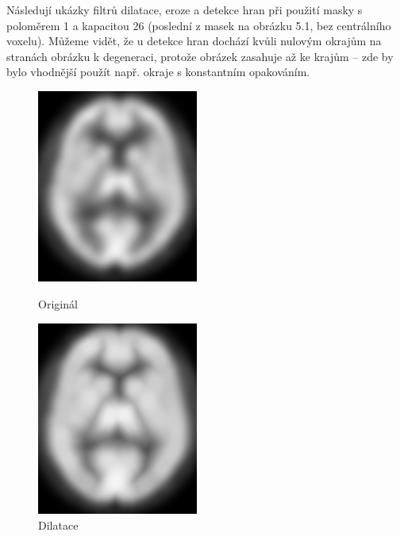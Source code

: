     Následují ukázky filtrů dilatace, eroze a detekce hran při použití masky s poloměrem 1 a kapacitou 26 (poslední z masek na obrázku 5.1, bez centrálního voxelu). Můžeme vidět, že u detekce hran dochází kvůli nulovým okrajům na stranách obrázku k degeneraci, protože obrázek zasahuje až ke krajům -- zde by bylo vhodnější použít např. okraje s konstantním opakováním.
    \vfill
    \newpage
    \begin{figure}[htp]
        \begin{minipage}[l]{0.5\textwidth}
            \center
            \includegraphics[width = 150pt]{src/8Appendix/final/original.png}
            \caption{Originál}
        \end{minipage}
        \begin{minipage}[r]{0.5\textwidth}
            \center
            \includegraphics[width = 150pt]{src/8Appendix/final/dilatace.png}
            \caption{Dilatace}
        \end{minipage}
     \end{figure}
